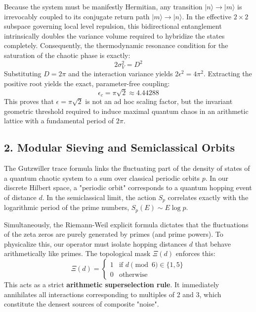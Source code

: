\documentclass[aps,prl,preprint,superscriptaddress,floatfix]{revtex4-2}
\begin{document}
Because the system must be manifestly Hermitian, any transition $|n\rangle \to |m\rangle$ is irrevocably coupled to its conjugate return path $|m\rangle \to |n\rangle$. In the effective $2 \times 2$ subspace governing local level repulsion, this bidirectional entanglement intrinsically doubles the variance volume required to hybridize the states completely. Consequently, the thermodynamic resonance condition for the saturation of the chaotic phase is exactly:
\begin{equation}
2 \sigma_V^2 = D^2
\end{equation}
Substituting $D = 2\pi$ and the interaction variance yields $2 \epsilon^2 = 4\pi^2$. Extracting the positive root yields the exact, parameter-free coupling:
\begin{equation}
\epsilon_c = \pi\sqrt{2} \approx 4.44288
\end{equation}
This proves that $\epsilon = \pi\sqrt{2}$ is not an ad hoc scaling factor, but the invariant geometric threshold required to induce maximal quantum chaos in an arithmetic lattice with a fundamental period of $2\pi$.

\subsection{2. Modular Sieving and Semiclassical Orbits}
The Gutzwiller trace formula links the fluctuating part of the density of states of a quantum chaotic system to a sum over classical periodic orbits $p$. In our discrete Hilbert space, a "periodic orbit" corresponds to a quantum hopping event of distance $d$. In the semiclassical limit, the action $S_p$ correlates exactly with the logarithmic period of the prime numbers, $S_p(E) \sim E \log p$.

Simultaneously, the Riemann-Weil explicit formula dictates that the fluctuations of the zeta zeros are purely generated by primes (and prime powers). To physicalize this, our operator must isolate hopping distances $d$ that behave arithmetically like primes. The topological mask $\Xi(d)$ enforces this:
\begin{equation}
\Xi(d) = \begin{cases} 1 & \text{if } d \pmod 6 \in \{1, 5\} \\ 0 & \text{otherwise} \end{cases}
\end{equation}
This acts as a strict \textbf{arithmetic superselection rule}. It immediately annihilates all interactions corresponding to multiples of 2 and 3, which constitute the densest sources of composite "noise". 
\end{document}
